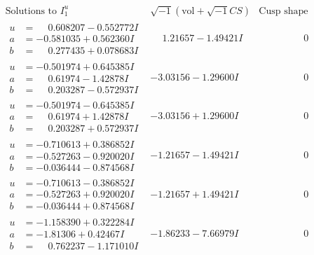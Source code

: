\documentclass[1p]{elsarticle_modified}
\theoremstyle{definition}
\newcommand{\I}{\sqrt{-1}}
\begin{document}
$$\begin{array}{c|c|c}
 \end{array}$$\newpage$$\begin{array}{c|c|c}  
\text{Solutions to }I^u_{1}& \I (\text{vol} + \sqrt{-1}CS) & \text{Cusp shape}\\
 \hline 
\begin{aligned}
u &= \phantom{-}0.608207 - 0.552772 I \\
a &= -0.581035 + 0.562360 I \\
b &= \phantom{-}0.277435 + 0.078683 I\end{aligned}
 & \phantom{-}1.21657 - 1.49421 I & \phantom{-0.000000 } 0 \\ \hline\begin{aligned}
u &= -0.501974 + 0.645385 I \\
a &= \phantom{-}0.61974 - 1.42878 I \\
b &= \phantom{-}0.203287 - 0.572937 I\end{aligned}
 & -3.03156 - 1.29600 I & \phantom{-0.000000 } 0 \\ \hline\begin{aligned}
u &= -0.501974 - 0.645385 I \\
a &= \phantom{-}0.61974 + 1.42878 I \\
b &= \phantom{-}0.203287 + 0.572937 I\end{aligned}
 & -3.03156 + 1.29600 I & \phantom{-0.000000 } 0 \\ \hline\begin{aligned}
u &= -0.710613 + 0.386852 I \\
a &= -0.527263 - 0.920020 I \\
b &= -0.036444 - 0.874568 I\end{aligned}
 & -1.21657 - 1.49421 I & \phantom{-0.000000 } 0 \\ \hline\begin{aligned}
u &= -0.710613 - 0.386852 I \\
a &= -0.527263 + 0.920020 I \\
b &= -0.036444 + 0.874568 I\end{aligned}
 & -1.21657 + 1.49421 I & \phantom{-0.000000 } 0 \\ \hline\begin{aligned}
u &= -1.158390 + 0.322284 I \\
a &= -1.81306 + 0.42467 I \\
b &= \phantom{-}0.762237 - 1.171010 I\end{aligned}
 & -1.86233 - 7.66979 I & \phantom{-0.000000 } 0 \\ \hline\begin{aligned}

\end{aligned}
\end{array}$$
\end{document}
